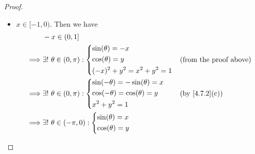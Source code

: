 \begin{proof}
\begin{itemize}
\begin{align*}
             & \big(x \in (0, 1]\big) \land \big(y \in (-1, 0]\big) \implies \exists \theta_2 \in [\dfrac{\pi}{2}, \pi) : \big(\sin(\theta_2) = x\big) \land \big(\cos(\theta_2) = y\big).
          \end{align*}
          But \(\cos\) is strictly decreasing on \((0, \pi)\) implies the choices of \(\theta_1\) and \(\theta_2\) are unique.
          And we conclude that
          \[
            \forall x \in (0, 1], \exists!\ \theta \in (0, \pi) : \begin{dcases}
              \sin(\theta) = x \\
              \cos(\theta) = y \\
              x^2 + y^2 = 1
            \end{dcases}
          \]
    \item \(x \in [-1, 0)\).
          Then we have
          \begin{align*}
                     & -x \in (0, 1]                                                                    \\
            \implies & \exists!\ \theta \in (0, \pi) : \begin{dcases}
                                                         \sin(\theta) = -x \\
                                                         \cos(\theta) = y  \\
                                                         (-x)^2 + y^2 = x^2 + y^2 = 1
                                                       \end{dcases}  &  & \text{(from the proof above)} \\
            \implies & \exists!\ \theta \in (0, \pi) : \begin{dcases}
                                                         \sin(-\theta) = -\sin(\theta) = x \\
                                                         \cos(-\theta) = \cos(\theta) = y  \\
                                                         x^2 + y^2 = 1
                                                       \end{dcases}  &  & \text{(by \cref{4.7.2}(c))}   \\
            \implies & \exists!\ \theta \in (-\pi, 0) : \begin{dcases}
                                                          \sin(\theta) = x \\
                                                          \cos(\theta) = y \\

\end{dcases}
\end{align*}
\end{itemize}
\end{proof}
